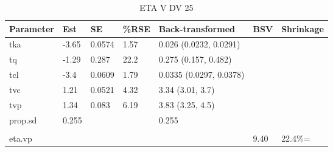 \begin{table}
\centering\centering
\caption{ETA V DV 25}
\centering
\fontsize{8}{10}\selectfont
\begin{tabular}[t]{lllllll}
\toprule
\textbf{Parameter} & \textbf{Est} & \textbf{SE} & \textbf{\%RSE} & \textbf{Back-transformed} & \textbf{BSV} & \textbf{Shrinkage}\\
\midrule
tka & -3.65 & 0.0574 & 1.57 & 0.026 (0.0232, 0.0291) &  & \\
\midrule
tq & -1.29 & 0.287 & 22.2 & 0.275 (0.157, 0.482) &  & \\
\midrule
tcl & -3.4 & 0.0609 & 1.79 & 0.0335 (0.0297, 0.0378) &  & \\
\midrule
tvc & 1.21 & 0.0521 & 4.32 & 3.34 (3.01, 3.7) &  & \\
\midrule
tvp & 1.34 & 0.083 & 6.19 & 3.83 (3.25, 4.5) &  & \\
\midrule
prop.sd & 0.255 &  &  & 0.255 &  & \\
\midrule\\
eta.vp &  &  &  &  & 9.40 & 22.4\%=\\
\bottomrule
\end{tabular}
\end{table}